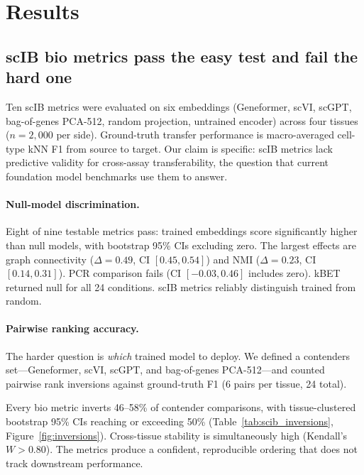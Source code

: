 \documentclass[11pt]{article}
\begin{document}
\section{Results}

\subsection{scIB bio metrics pass the easy test and fail the hard one}
\label{sec:scib}

Ten scIB metrics were evaluated on six embeddings (Geneformer, scVI, scGPT, bag-of-genes PCA-512, random projection, untrained encoder) across four tissues ($n = 2{,}000$ per side). Ground-truth transfer performance is macro-averaged cell-type kNN F1 from source to target. Our claim is specific: scIB metrics lack predictive validity for cross-assay transferability, the question that current foundation model benchmarks use them to answer.

\paragraph{Null-model discrimination.} Eight of nine testable metrics pass: trained embeddings score significantly higher than null models, with bootstrap 95\% CIs excluding zero. The largest effects are graph connectivity ($\Delta = 0.49$, CI $[0.45, 0.54]$) and NMI ($\Delta = 0.23$, CI $[0.14, 0.31]$). PCR comparison fails (CI $[-0.03, 0.46]$ includes zero). kBET returned null for all 24 conditions. scIB metrics reliably distinguish trained from random.

\paragraph{Pairwise ranking accuracy.} The harder question is \emph{which} trained model to deploy. We defined a contenders set---Geneformer, scVI, scGPT, and bag-of-genes PCA-512---and counted pairwise rank inversions against ground-truth F1 (6 pairs per tissue, 24 total).

Every bio metric inverts 46--58\% of contender comparisons, with tissue-clustered bootstrap 95\% CIs reaching or exceeding 50\% (Table~\ref{tab:scib_inversions}, Figure~\ref{fig:inversions}). Cross-tissue stability is simultaneously high (Kendall's $W > 0.80$). The metrics produce a confident, reproducible ordering that does not track downstream performance.
\end{document}
